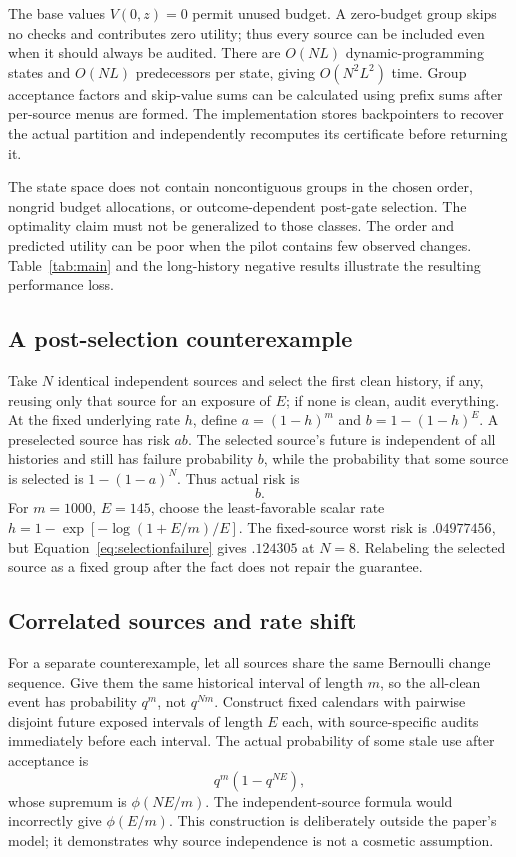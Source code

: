 The base values $V(0,z)=0$ permit unused budget. A zero-budget group skips no checks and contributes zero utility; thus every source can be included even when it should always be audited. There are $O(NL)$ dynamic-programming states and $O(NL)$ predecessors per state, giving $O(N^2L^2)$ time. Group acceptance factors and skip-value sums can be calculated using prefix sums after per-source menus are formed. The implementation stores backpointers to recover the actual partition and independently recomputes its certificate before returning it.

The state space does not contain noncontiguous groups in the chosen order, nongrid budget allocations, or outcome-dependent post-gate selection. The optimality claim must not be generalized to those classes. The order and predicted utility can be poor when the pilot contains few observed changes. Table~\ref{tab:main} and the long-history negative results illustrate the resulting performance loss.

\subsection{A post-selection counterexample}
Take $N$ identical independent sources and select the first clean history, if any, reusing only that source for an exposure of $E$; if none is clean, audit everything. At the fixed underlying rate $h$, define $a=(1-h)^m$ and $b=1-(1-h)^E$. A preselected source has risk $ab$. The selected source's future is independent of all histories and still has failure probability $b$, while the probability that some source is selected is $1-(1-a)^N$. Thus actual risk is
\begin{equation}
 [1-(1-a)^N]b.\label{eq:selectionfailure}
\end{equation}
For $m=1000$, $E=145$, choose the least-favorable scalar rate $h=1-\exp[-\log(1+E/m)/E]$. The fixed-source worst risk is $.04977456$, but Equation~\eqref{eq:selectionfailure} gives $.124305$ at $N=8$. Relabeling the selected source as a fixed group after the fact does not repair the guarantee.

\subsection{Correlated sources and rate shift}
For a separate counterexample, let all sources share the same Bernoulli change sequence. Give them the same historical interval of length $m$, so the all-clean event has probability $q^m$, not $q^{Nm}$. Construct fixed calendars with pairwise disjoint future exposed intervals of length $E$ each, with source-specific audits immediately before each interval. The actual probability of some stale use after acceptance is
\begin{equation}
 q^m(1-q^{NE}),
\end{equation}
whose supremum is $\phi(NE/m)$. The independent-source formula would incorrectly give $\phi(E/m)$. This construction is deliberately outside the paper's model; it demonstrates why source independence is not a cosmetic assumption.

